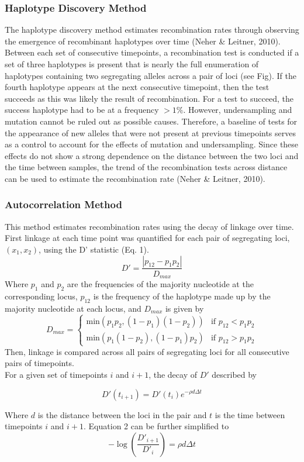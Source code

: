 \documentclass[12pt]{article}
\begin{document}
\subsubsection*{Haplotype Discovery Method}
The haplotype discovery method estimates recombination rates through observing the emergence of recombinant haplotypes over time (Neher \& Leitner, 2010). Between each set of consecutive timepoints, a recombination test is conducted if a set of three haplotypes is present that is nearly the full enumeration of haplotypes containing two segregating alleles across a pair of loci (see Fig). If the fourth haplotype appears at the next consecutive timepoint, then the test succeeds as this was likely the result of recombination. For a test to succeed, the success haplotype had to be at a frequency $>1\%$.  However, undersampling and mutation cannot be ruled out as possible causes. Therefore, a baseline of tests for the appearance of new alleles that were not present at previous timepoints serves as a control to account for the effects of mutation and undersampling. Since these effects do not show a strong dependence on the distance between the two loci and the time between samples, the trend of the recombination tests across distance can be used to estimate the recombination rate (Neher \& Leitner, 2010).
\newpage
\subsubsection*{Autocorrelation Method}

    This method estimates recombination rates using the decay of linkage over time. First linkage at each time point was quantified for each pair of segregating loci, $(x_1, x_2)$, using the D’ statistic (Eq. 1). 
 \begin{equation}
 D' = \frac{|p_{12} - p_1p_2|}{D_{max}}
 \end{equation}
     Where $p_1$ and $p_2$ are the frequencies of the majority nucleotide at the corresponding locus, $p_{12}$ is the frequency of the haplotype made up by the majority nucleotide at each locus, and $D_{max}$ is given by
\[
    D_{max} = \begin{cases}
    \text{min}(p_1p_2, (1-p_1)(1-p_2)) & \text{if }p_{12} < p_1p_2\\
    \text{min}(p_1(1-p_2), (1-p_1)p_2) & \text{if }p_{12} > p_1p_2
    \end{cases}
\]
Then, linkage is compared across all pairs of segregating loci for all consecutive pairs of timepoints.\\


\noindent For a given set of timepoints $i$ and $i+1$, the decay of $D'$ described by

\begin{equation}
D'(t_{i+1}) =  D'(t_i)  e^{-\rho d \Delta t}
\end{equation}

\noindent Where $d$ is the distance between the loci in the pair and $t$ is the time between timepoints $i$ and $i+1$. Equation 2 can be further simplified to
\begin{equation}
-\log \left(\frac{D'_{i+1}}{D'_i}\right) = \rho d \Delta t
\end{equation}
\end{document}
